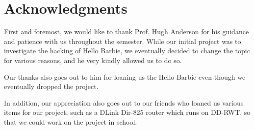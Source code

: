 \documentclass{acm_proc_article-sp}
\begin{document}
\section{Acknowledgments}
First and foremost, we would like to thank Prof. Hugh Anderson for his guidance and patience with us throughout the semester. While our initial project was to investigate the hacking of Hello Barbie, we eventually decided to change the topic for various reasons, and he very kindly allowed us to do so. 

Our thanks also goes out to him for loaning us the Hello Barbie even though we eventually dropped the project. 

In addition, our appreciation also goes out to our friends who loaned us various items for our project, such as a DLink Dir-825 router which runs on DD-RWT, so that we could work on the project in school. 

%

%
%
\end{document}
